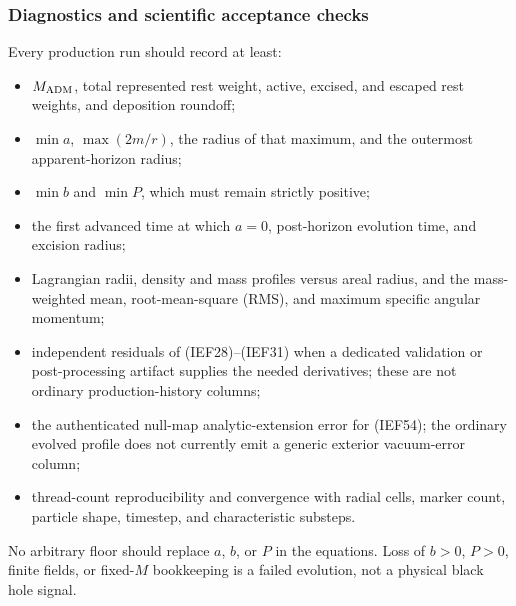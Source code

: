 \subsubsection{Diagnostics and scientific acceptance checks}

Every production run should record at least:
\begin{itemize}
\item \(M_{\rm ADM}\), total represented rest weight, active, excised, and
      escaped rest weights, and deposition roundoff;
\item \(\min a\), \(\max(2m/r)\), the radius of that maximum, and the
      outermost apparent-horizon radius;
\item \(\min b\) and \(\min P\), which must remain strictly positive;
\item the first advanced time at which \(a=0\), post-horizon evolution time,
      and excision radius;
\item Lagrangian radii, density and mass profiles versus areal radius, and
      the mass-weighted mean, root-mean-square (RMS), and maximum specific
      angular momentum;
\item independent residuals of (IEF28)--(IEF31) when a dedicated validation
      or post-processing artifact supplies the needed derivatives; these are
      not ordinary production-history columns;
\item the authenticated null-map analytic-extension error for (IEF54); the
      ordinary evolved profile does not currently emit a generic exterior
      vacuum-error column;
\item thread-count reproducibility and convergence with radial cells, marker
      count, particle shape, timestep, and characteristic substeps.
\end{itemize}
No arbitrary floor should replace \(a\), \(b\), or \(P\) in the equations.
Loss of \(b>0\), \(P>0\), finite fields, or fixed-\(M\) bookkeeping is a failed
evolution, not a physical black hole signal.

